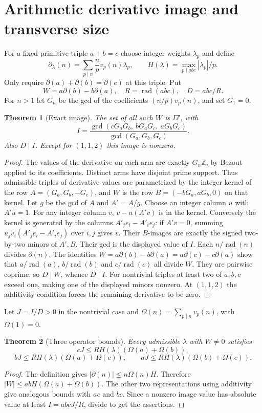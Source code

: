 \documentclass[11pt]{amsart}
\newtheorem{theorem}{Theorem}[section]
\theoremstyle{definition}\newtheorem{definition}[theorem]{Definition}
\theoremstyle{remark}\newtheorem{remark}[theorem]{Remark}
\newcommand{\Z}{\mathbb Z}\newcommand{\N}{\mathbb N}
\newcommand{\rad}{\operatorname{rad}}\newcommand{\lcm}{\operatorname{lcm}}
\begin{document}
\section{Arithmetic derivative image and transverse size}
For a fixed primitive triple $a+b=c$ choose integer weights $\lambda_p$ and define
\[
 \partial_\lambda(n)=\sum_{p\mid n}\frac np v_p(n)\lambda_p,
 \qquad H(\lambda)=\max_{p\mid abc}|\lambda_p|/p.
\]
Only require $\partial(a)+\partial(b)=\partial(c)$ at this triple. Put
\[
 W=a\partial(b)-b\partial(a),\quad R=\rad(abc),\quad D=abc/R.
\]
For $n>1$ let $G_n$ be the gcd of the coefficients $(n/p)v_p(n)$, and set $G_1=0$.
\begin{theorem}[Exact image]\label{thm:image}
The set of all such $W$ is $I\Z$, with
\[
 I=\frac{\gcd(cG_aG_b,\ bG_aG_c,\ aG_bG_c)}{\gcd(G_a,G_b,G_c)}.
\]
Also $D\mid I$. Except for $(1,1,2)$ this image is nonzero.
\end{theorem}
\begin{proof}
The values of the derivative on each arm are exactly $G_n\Z$, by Bezout applied to its coefficients. Distinct arms have disjoint prime support. Thus admissible triples of derivative values are parametrized by the integer kernel of the row $A=(G_a,G_b,-G_c)$, and $W$ is the row $B=(-bG_a,aG_b,0)$ on that kernel.
Let $g$ be the gcd of $A$ and $A'=A/g$. Choose an integer column $u$ with $A'u=1$. For any integer column $v$, $v-u(A'v)$ is in the kernel. Conversely the kernel is generated by the columns $A'_j e_i-A'_i e_j$: if $A'v=0$, summing $u_jv_i(A'_j e_i-A'_i e_j)$ over $i,j$ gives $v$. Their $B$-images are exactly the signed two-by-two minors of $A',B$. Their gcd is the displayed value of $I$.
Each $n/\rad(n)$ divides $\partial(n)$. The identities $W=a\partial(b)-b\partial(a)=a\partial(c)-c\partial(a)$ show that $a/\rad(a)$, $b/\rad(b)$ and $c/\rad(c)$ all divide $W$. They are pairwise coprime, so $D\mid W$, whence $D\mid I$. For nontrivial triples at least two of $a,b,c$ exceed one, making one of the displayed minors nonzero. At $(1,1,2)$ the additivity condition forces the remaining derivative to be zero.
\end{proof}
Let $J=I/D>0$ in the nontrivial case and $\Omega(n)=\sum_{p\mid n}v_p(n)$, with $\Omega(1)=0$.
\begin{theorem}[Three operator bounds]\label{thm:operator}
Every admissible $\lambda$ with $W\ne0$ satisfies
\[
 cJ\le RH(\lambda)(\Omega(a)+\Omega(b)),
\]
\[
 bJ\le RH(\lambda)(\Omega(a)+\Omega(c)),\qquad
 aJ\le RH(\lambda)(\Omega(b)+\Omega(c)).
\]
\end{theorem}
\begin{proof}
The definition gives $|\partial(n)|\le n\Omega(n)H$. Therefore $|W|\le abH(\Omega(a)+\Omega(b))$. The other two representations using additivity give analogous bounds with $ac$ and $bc$. Since a nonzero image value has absolute value at least $I=abcJ/R$, divide to get the assertions.
\end{proof}
\end{document}
